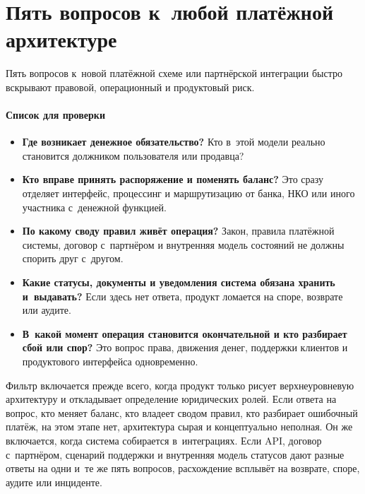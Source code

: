 \section{Пять вопросов к~любой платёжной архитектуре}\label{sec:regulation-checklist}

Пять вопросов к~новой платёжной схеме или партнёрской интеграции быстро вскрывают правовой, операционный и продуктовый риск.

\paragraph{Список для проверки}
\begin{itemize}
  \item \textbf{Где возникает денежное обязательство?}
    Кто в~этой модели реально становится должником
    пользователя или продавца?
  \item \textbf{Кто вправе принять распоряжение и поменять баланс?}
    Это сразу отделяет интерфейс, процессинг и маршрутизацию
    от банка, НКО или иного участника с~денежной функцией.
  \item \textbf{По какому своду правил живёт операция?}
    Закон, правила платёжной системы, договор с~партнёром
    и внутренняя модель состояний не должны спорить друг с~другом.
  \item \textbf{Какие статусы, документы и уведомления система
    обязана хранить и~выдавать?} Если здесь нет ответа,
    продукт ломается на споре,
    возврате или аудите.
  \item \textbf{В~какой момент операция становится окончательной
    и кто разбирает сбой или спор?} Это вопрос права,
    движения денег, поддержки клиентов
    и продуктового интерфейса одновременно.
\end{itemize}

Фильтр включается прежде всего, когда продукт только рисует верхнеуровневую архитектуру и откладывает определение юридических ролей. Если ответа на вопрос, кто меняет баланс, кто владеет сводом правил, кто разбирает ошибочный платёж, на этом этапе нет, архитектура сырая и концептуально неполная.
Он же включается, когда система собирается в~интеграциях. Если API, договор с~партнёром, сценарий поддержки и внутренняя модель статусов дают разные ответы на одни и~те же пять вопросов, расхождение всплывёт на возврате, споре, аудите или инциденте.

